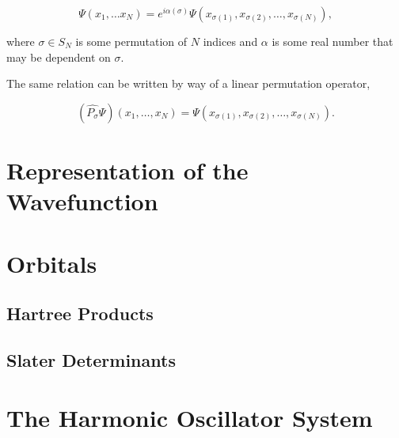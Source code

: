         \begin{equation}
            \Psi(x_1, \dots x_N) 
            =
            e^{i\alpha(\sigma)}\Psi(x_{\sigma(1)}, x_{\sigma(2)}, \dots, x_{\sigma(N)}),
        \end{equation}

        where $\sigma \in S_N$ is some permutation of $N$ indices and $\alpha$ is 
        some real number that may be dependent on $\sigma$.

        The same relation can be written by way of a linear permutation operator,

        \begin{equation}
            (\hat{P_\sigma}\Psi)(x_1, \dots, x_N)
            =
            \Psi(x_{\sigma(1)}, x_{\sigma(2)}, \dots, x_{\sigma(N)}).
        \end{equation}
    
\section{Representation of the Wavefunction}

    \section{Orbitals}

    \subsection{Hartree Products}

    \subsection{Slater Determinants}

\section{The Harmonic Oscillator System}